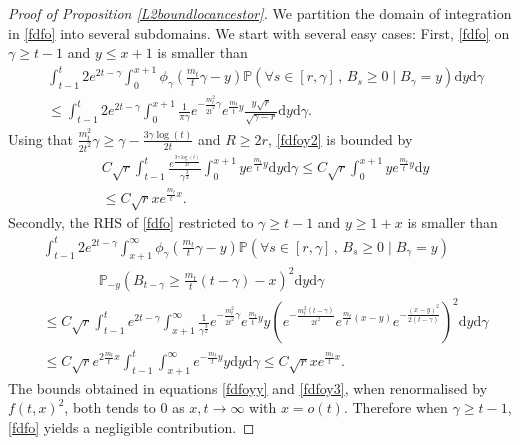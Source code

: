 \documentclass[10pt,a4paper]{amsart}
\newcommand{\Prob}{\mathbb{P}}
\begin{document}
\begin{proof}[Proof of Proposition \ref{L2boundlocancestor}]
We partition the domain of integration in \eqref{fdfo} into several subdomains.
We start with several easy cases: First, \eqref{fdfo} on $\gamma \geq t-1$ and $y \leq x+1$ is smaller than
\begin{equation}\label{fdfoy2}
    \begin{split}
        &\int_{t-1}^t 2e^{2t-\gamma}\int_{0}^{x+1}\phi_\gamma\left(\frac{m_t}{t}\gamma-y\right)\Prob\left(\forall s \in [r, \gamma] \, , \, B_s \geq 0 \mid B_\gamma = y \right)\mathrm{d}y\mathrm{d}\gamma
        \\& \leq \int_{t-1}^t 2e^{2t-\gamma}\int_{0}^{x+1}\frac{1}{\pi \gamma}e^{-\frac{m_t^2}{2t^2}\gamma}e^{\frac{m_t}{t}y}\frac{y \sqrt{r}}{\sqrt{\gamma - r}}\mathrm{d}y\mathrm{d}\gamma.
    \end{split}
\end{equation}
Using that $\frac{m_t^2}{2t^2}\gamma\geq  \gamma -\frac{3\gamma \log(t)}{2t}$ and $R\geq 2r$, \eqref{fdfoy2} is bounded by
\begin{equation}\label{fdfoyy}
    \begin{split}
        &C\sqrt{r}\int_{t-1}^t \frac{e^{\frac{3\gamma \log(t)}{2t}}}{\gamma^{\frac{3}{2}}}\int_{0}^{x+1}ye^{\frac{m_t}{t}y}\mathrm{d}y\mathrm{d}\gamma\leq C\sqrt{r}\int_{0}^{x+1}ye^{\frac{m_t}{t}y}\mathrm{d}y
        \\& \leq  C\sqrt{r}xe^{\frac{m_t}{t}x}.
    \end{split}
\end{equation}
Secondly, the RHS of \eqref{fdfo} restricted to $\gamma \geq t-1$ and $y\geq 1+x$ is smaller than
\begin{equation}\label{fdfoy3}
    \begin{split}
        &\int_{t-1}^t 2e^{2t-\gamma}\int_{x+1}^{\infty}\phi_\gamma\left(\frac{m_t}{t}\gamma-y\right)\Prob\left(\forall s \in [r, \gamma] \, , \, B_s \geq 0 \mid B_\gamma = y \right)\\
        & \qquad \qquad \Prob_{-y}\left( B_{t- \gamma} \geq \frac{m_t}{t}(t- \gamma)-x\right) ^2  \mathrm{d}y\mathrm{d}\gamma
        \\& \leq C \sqrt{r} \int_{t-1}^t e^{2t-\gamma}\int_{x+1}^{\infty}\frac{1}{ \gamma^{\frac{3}{2}}}e^{-\frac{m_t^2}{2t^2}\gamma}e^{\frac{m_t}{t}y}y\left(e^{-\frac{m_t^2(t-\gamma)}{2t^2}}e^{\frac{m_t}{t}(x-y)}e^{-\frac{(x-y)^2}{2(t-\gamma)}}\right)^2\mathrm{d}y\mathrm{d}\gamma
        \\& \leq C \sqrt{r}e^{2\frac{m_t}{t}x} \int_{t-1}^t \int_{x+1}^{\infty}e^{-\frac{m_t}{t}y}y\mathrm{d}y\mathrm{d}\gamma\leq C \sqrt{r}xe^{\frac{m_t}{t}x}.
    \end{split}
\end{equation}
The bounds obtained in equations \eqref{fdfoyy} and \eqref{fdfoy3}, when renormalised by $f(t,x)^2$, both tends to $0$ as $x,t\to \infty$ with  $x=o(t)$. Therefore when $\gamma \geq t-1$, \eqref{fdfo} yields a negligible contribution.


\end{proof}
\end{document}
